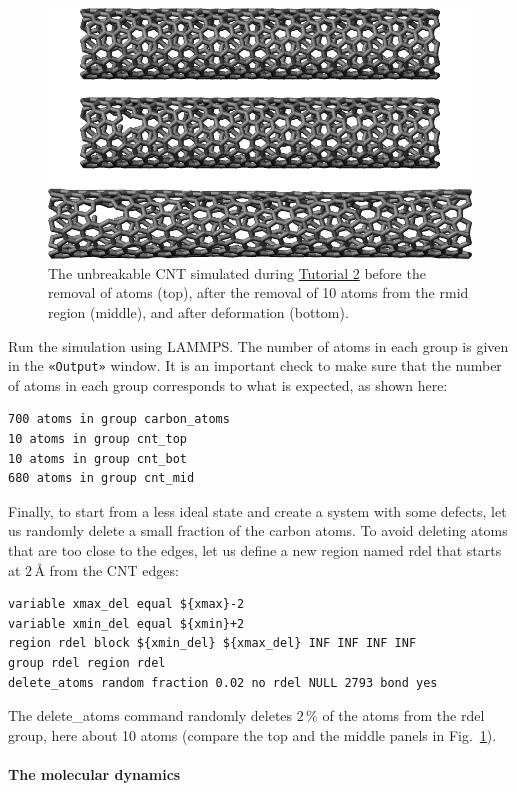 \documentclass[9pt,tutorial]{livecoms}
\newcommand{\lmpcmd}[1]{\colorbox{listing}{\textcolor{command}{\small{#1}}}} %
\newcommand{\guicmd}[1]{\textcolor{command}{\texttt{«#1»}}} %
\begin{document}
\begin{figure}
\centering
\includegraphics[width=\linewidth]{CNT-unbreakable}
\caption{The unbreakable CNT simulated during \hyperref[carbon-nanotube-label]{Tutorial 2}
before the removal of atoms (top), after the removal of 10 atoms from the \lmpcmd{rmid}
region (middle), and after deformation (bottom).}
\label{fig:CNT-unbreakable}
\end{figure}

Run the simulation using LAMMPS.  The number of atoms in each group is given in
the \guicmd{Output} window.  It is an important check to make sure that the number
of atoms in each group corresponds to what is expected, as shown here:
\begin{lstlisting}
700 atoms in group carbon_atoms
10 atoms in group cnt_top
10 atoms in group cnt_bot
680 atoms in group cnt_mid
\end{lstlisting}

Finally, to start from a less ideal state and create a system with some defects,
let us randomly delete a small fraction of the carbon atoms.  To avoid deleting
atoms that are too close to the edges, let us define a new region named \lmpcmd{rdel}
that starts at $2\,\text{\AA{}}$ from the CNT edges:
\begin{lstlisting}
variable xmax_del equal ${xmax}-2
variable xmin_del equal ${xmin}+2
region rdel block ${xmin_del} ${xmax_del} INF INF INF INF
group rdel region rdel
delete_atoms random fraction 0.02 no rdel NULL 2793 bond yes
\end{lstlisting}
The \lmpcmd{delete\_atoms} command randomly deletes $2\,\%$ of the atoms from
the \lmpcmd{rdel} group, here about 10 atoms (compare the top
and the middle panels in Fig.~\ref{fig:CNT-unbreakable}).

\paragraph{The molecular dynamics}
\end{document}
